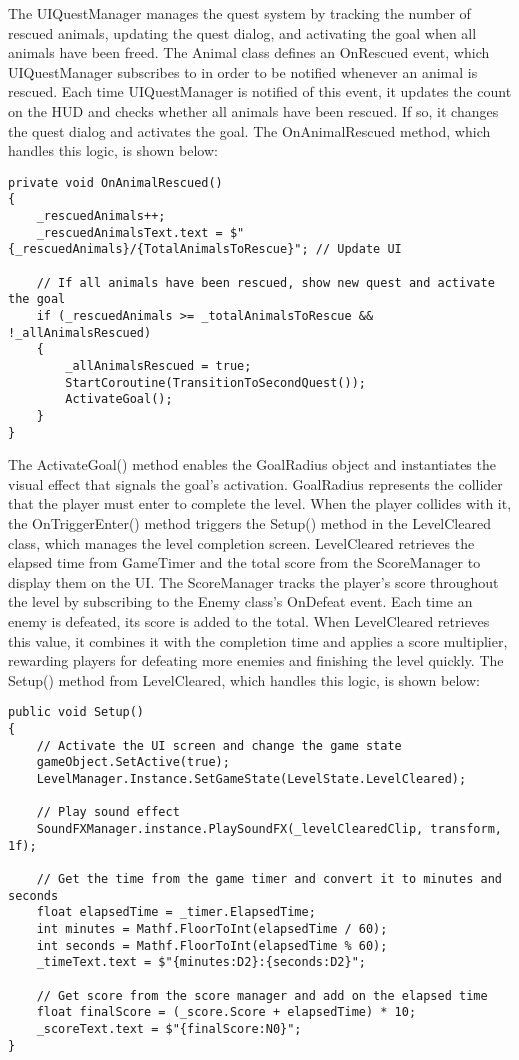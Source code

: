 \documentclass[10pt]{final_report}
\begin{document}
The UIQuestManager manages the quest system by tracking the number of rescued animals, updating the quest dialog, and activating the goal when all animals have been freed. The Animal class defines an OnRescued event, which UIQuestManager subscribes to in order to be notified whenever an animal is rescued. Each time UIQuestManager is notified of this event, it updates the count on the HUD and checks whether all animals have been rescued. If so, it changes the quest dialog and activates the goal. The OnAnimalRescued method, which handles this logic, is shown below:
\begin{verbatim}
private void OnAnimalRescued()
{
    _rescuedAnimals++;
    _rescuedAnimalsText.text = $"{_rescuedAnimals}/{TotalAnimalsToRescue}"; // Update UI

    // If all animals have been rescued, show new quest and activate the goal
    if (_rescuedAnimals >= _totalAnimalsToRescue && !_allAnimalsRescued)
    {
        _allAnimalsRescued = true;
        StartCoroutine(TransitionToSecondQuest());
        ActivateGoal();
    }
}
\end{verbatim}
The ActivateGoal() method enables the GoalRadius object and instantiates the visual effect that signals the goal’s activation. GoalRadius represents the collider that the player must enter to complete the level. When the player collides with it, the OnTriggerEnter() method triggers the Setup() method in the LevelCleared class, which manages the level completion screen.
LevelCleared retrieves the elapsed time from GameTimer and the total score from the ScoreManager to display them on the UI. The ScoreManager tracks the player’s score throughout the level by subscribing to the Enemy class's OnDefeat event. Each time an enemy is defeated, its score is added to the total. When LevelCleared retrieves this value, it combines it with the completion time and applies a score multiplier, rewarding players for defeating more enemies and finishing the level quickly. The Setup() method from LevelCleared, which handles this logic, is shown below:
\begin{verbatim}
public void Setup()
{
    // Activate the UI screen and change the game state
    gameObject.SetActive(true);
    LevelManager.Instance.SetGameState(LevelState.LevelCleared);

    // Play sound effect
    SoundFXManager.instance.PlaySoundFX(_levelClearedClip, transform, 1f);

    // Get the time from the game timer and convert it to minutes and seconds
    float elapsedTime = _timer.ElapsedTime;
    int minutes = Mathf.FloorToInt(elapsedTime / 60);
    int seconds = Mathf.FloorToInt(elapsedTime % 60);
    _timeText.text = $"{minutes:D2}:{seconds:D2}";

    // Get score from the score manager and add on the elapsed time
    float finalScore = (_score.Score + elapsedTime) * 10;
    _scoreText.text = $"{finalScore:N0}";
}
\end{verbatim}
\end{document}
